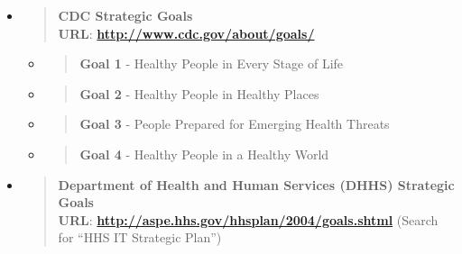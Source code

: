 \documentclass[a4paper, 11pt]{article}
\begin{document}
\begin{itemize}
\item
  \begin{quote}
  \textbf{CDC Strategic Goals}\\
  \textbf{URL}:
  \href{http://www.cdc.gov/about/goals/}{\textbf{http://www.cdc.gov/about/goals/}}
  \end{quote}

  \begin{itemize}
  \item
    \begin{quote}
    \textbf{Goal 1} - Healthy People in Every Stage of Life
    \end{quote}
  \item
    \begin{quote}
    \textbf{Goal 2} - Healthy People in Healthy Places
    \end{quote}
  \item
    \begin{quote}
    \textbf{Goal 3} - People Prepared for Emerging Health Threats
    \end{quote}
  \item
    \begin{quote}
    \textbf{Goal 4} - Healthy People in a Healthy World
    \end{quote}
  \end{itemize}
\item
  \begin{quote}
  \textbf{Department of Health and Human Services (DHHS) Strategic Goals}\\
  \textbf{URL}:
  \href{http://aspe.hhs.gov/hhsplan/2004/goals.shtml}{\textbf{http://aspe.hhs.gov/hhsplan/2004/goals.shtml}}
  (Search for ``HHS IT Strategic Plan'')
  \end{quote}


\end{itemize}
\end{document}
